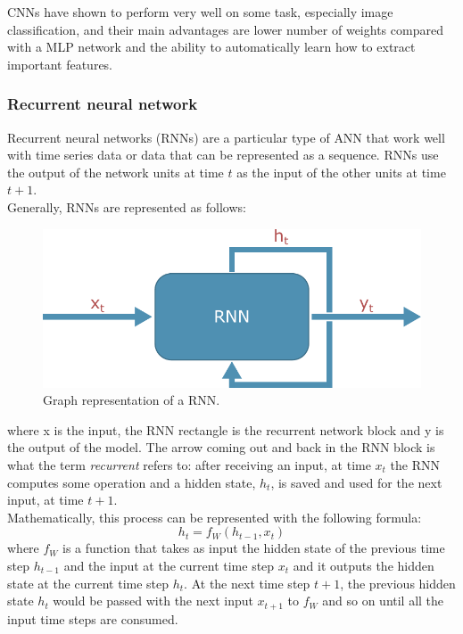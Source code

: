 \glspl{CNN} have shown to perform very well on some task, especially image classification, and their main advantages are lower number of  weights compared with a \gls{MLP} network and the ability to automatically learn how to extract important features.

\subsubsection{Recurrent neural network}
Recurrent neural networks (\glspl{RNN}) are a particular type of \gls{ANN} that work well with time series data or data that can be represented as a sequence. \glspl{RNN} use the output of the network units at time $t$ as the input of the other units at time $t+1$. \\

Generally, \glspl{RNN} are represented as follows:\\

\begin{figure}[H]
\centering
    \includegraphics[width=.55\linewidth]{images/Background/ML/RNN.pdf}
\caption[Graph representation of a recurrent neural network]{Graph representation of a \gls{RNN}.}
\end{figure}

\noindent where x is the input, the \gls{RNN} rectangle is the recurrent network block and y is the output of the model. The arrow coming out and back in the RNN block is what the term \emph{recurrent} refers to: after receiving an input, at time $x_t$ the RNN computes some operation and a hidden state, $h_t$, is saved and used for the next input, at time $t+1$.  \\

Mathematically, this process can be represented with the following formula:
\begin{equation*}
    h_t = f_W(h_{t-1},x_t)
\end{equation*}
\noindent where $f_W$ is a function that takes as input the hidden state of the previous time step $h_{t-1}$ and the input at the current time step $x_t$ and it outputs the hidden state at the current time step $h_t$. At the next time step $t+1$, the previous hidden state $h_t$ would be passed with the next input $x_{t+1}$ to $f_W$ and so on until all the input time steps are consumed.\\

